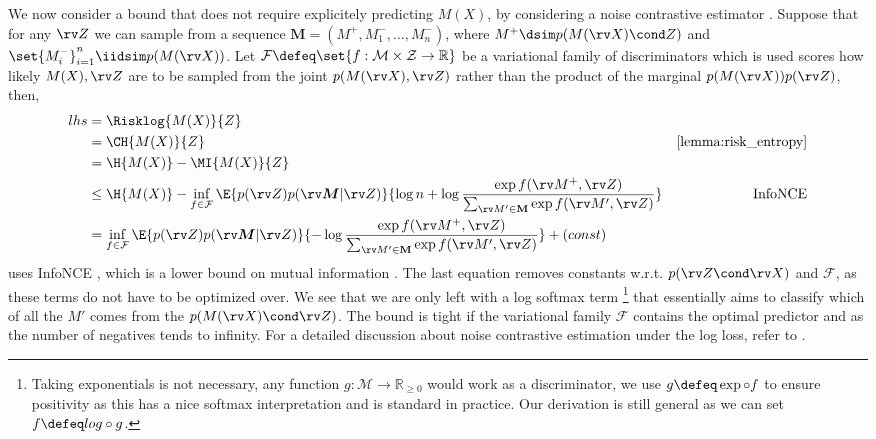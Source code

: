 \documentclass[final]{article}
\begin{document}
We now consider a bound that does not require explicitely predicting $M(X)$, by considering a noise contrastive estimator \cite{gutmann_noise-contrastive_2010}.
Suppose that for any $\rv Z$ we can sample from a sequence $\mathbf{M} = (M^+, M^-_1, \dots, M^-_n)$, where $M^+ \dsim p(M(\rv X) \cond Z)$ and $\set{M^-_i}_{i=1}^n \iidsim p(M(\rv X))$.
Let $\mathcal{F} \defeq \set{f : \mathcal{M} \times \mathcal{Z} \to \mathbb{R}}$ be a variational family of discriminators which is used scores how likely $M(X),\rv Z$ are to be sampled from the joint $p(M(\rv X),\rv Z)$ rather than the product of the marginal $p(M(\rv X))p(\rv Z)$, then,
\begin{align}\label{eq:contrastive_distortion_bound}
lhs &= \Risklog{M(X)}{Z}\\
&= \CH{M(X)}{Z} & \text{\cref{lemma:risk_entropy}}\\
&= \H{M(X)} - \MI{M(X)}{Z} \label{eq:MIMXz} \\
&\leq \H{M(X)} - \inf_{f \in \mathcal{F}}  \E{p(\rv Z) p(\boldsymbol{\rv M} | \rv Z)}{\log n + \log \frac{\exp f(\rv M^+, \rv Z)}{\sum_{\rv M' \in \mathbf{M}} \exp f(\rv M', \rv Z) }}  \label{eq:infonce_bound} & \text{InfoNCE} \\
&= \inf_{f \in \mathcal{F}}  \E{p(\rv Z) p(\boldsymbol{\rv M} | \rv Z)}{- \log \frac{\exp f(\rv M^+, \rv Z)}{\sum_{\rv M' \in \mathbf{M}} \exp f(\rv M', \rv Z) }} + (const)   
\end{align}
 uses InfoNCE \cite{oord_representation_2019}, which is a lower bound on mutual information \cite{poole_variational_2019,song_multi-label_2020}.
The last equation removes constants w.r.t. $p(\rv Z \cond \rv X)$ and $\mathcal{F}$, as these terms do not have to be optimized over.
We see that we are only left with a log softmax term
\footnote{Taking exponentials is not necessary, any function $g : \mathcal{M} \to \mathbb{R}_{\geq 0}$ would work as a discriminator, we use $g \defeq \exp \circ f$ to ensure positivity as this has a nice softmax interpretation and is standard in practice.
Our derivation is still general as we can set $f \defeq log \circ g$.
}
that essentially aims to classify which of all the $M'$ comes from the $p(M(\rv X) \cond \rv Z)$.
The bound is tight if the variational family $\mathcal{F}$ contains the optimal predictor 
and as the number of negatives tends to infinity.
For a detailed discussion about noise contrastive estimation under the log loss, refer to \cite{gutmann_noise-contrastive_2010,ma_noise_2018,rhodes_variational_2019}.
\end{document}
